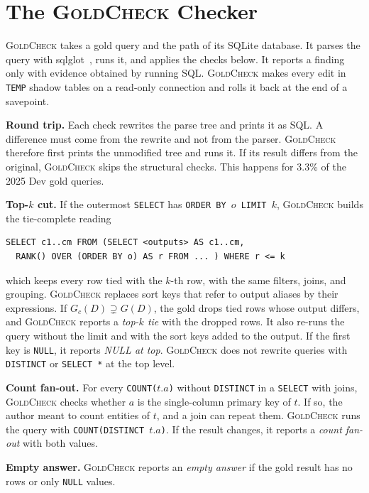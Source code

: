 \documentclass[conference]{IEEEtran}
\newcommand{\sys}{\textsc{GoldCheck}}
\begin{document}
\section{The \sys{} Checker}
\label{sec:method}

\sys{} takes a gold query and the path of its SQLite database. It parses the
query with sqlglot~\cite{sqlglot}, runs it, and applies the checks below. It reports a finding
only with evidence obtained by running SQL. \sys{} makes every edit in
\texttt{TEMP} shadow tables on a read-only connection and rolls it back at the
end of a savepoint.

\textbf{Round trip.} Each check rewrites the parse tree and prints it as SQL. A
difference must come from the rewrite and not from the parser. \sys{} therefore
first prints the unmodified tree and runs it. If its result differs from the
original, \sys{} skips the structural checks. This happens for 3.3\% of the 2025
Dev gold queries.

\textbf{Top-$k$ cut.} If the outermost \texttt{SELECT} has
\texttt{ORDER BY $o$ LIMIT $k$}, \sys{} builds the tie-complete reading
\begin{lstlisting}
SELECT c1..cm FROM (SELECT <outputs> AS c1..cm,
  RANK() OVER (ORDER BY o) AS r FROM ... ) WHERE r <= k
\end{lstlisting}
which keeps every row tied with the $k$-th row, with the same filters, joins, and
grouping. \sys{} replaces sort keys that refer to output aliases by their
expressions. If $G_c(D) \supsetneq G(D)$, the gold drops tied rows whose output
differs, and \sys{} reports a \emph{top-$k$ tie} with the dropped rows. It also
re-runs the query without the limit and with the sort keys added to the output.
If the first key is \texttt{NULL}, it reports \emph{NULL at top}. \sys{} does
not rewrite queries with \texttt{DISTINCT} or \texttt{SELECT *} at the top
level.

\textbf{Count fan-out.} For every \texttt{COUNT($t.a$)} without
\texttt{DISTINCT} in a \texttt{SELECT} with joins, \sys{} checks whether $a$ is
the single-column primary key of $t$. If so, the author meant to count entities
of $t$, and a join can repeat them. \sys{} runs the query with
\texttt{COUNT(DISTINCT $t.a$)}. If the result changes, it reports a \emph{count
fan-out} with both values.

\textbf{Empty answer.} \sys{} reports an \emph{empty answer} if the gold
result has no rows or only \texttt{NULL} values.
\end{document}
